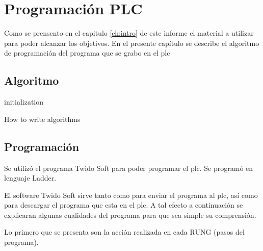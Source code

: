 \chapter{Programación PLC}
\label{ch:progPLC}
Como se prensento en el capitulo \ref{ch:intro} de este informe el material a utilizar
para poder alcanzar los objetivos. En el presente capítulo se describe el algoritmo 
de programación del programa que se grabo en el \gls{plc} 
\section{Algoritmo}
\label{sec:Algoritmo}

\begin{algorithm}[H]
 initialization\;
 \caption{How to write algorithms}
\end{algorithm}




\section{Programación}
\label{sec:Programacion}
Se utilizó el programa Twido Soft para poder programar el \gls{plc}. Se programó
en lenguaje Ladder.

El software Twido Soft sirve tanto como para enviar el programa al \gls{plc}, así como 
para descargar el programa que esta en el \gls{plc}. A tal efecto a continuación 
se explicaran algunas cualidades del programa para que sea simple su comprensión.

Lo primero que se presenta son la acción realizada en cada RUNG (pasos del programa).

